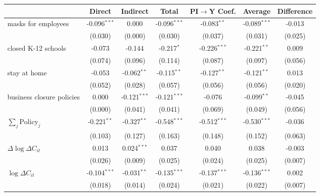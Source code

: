 
\begin{tabular}{lccccc|>{}c}
\toprule
  & Direct & Indirect & Total & PI$\to$Y Coef. & Average & Difference\\
\midrule
masks for employees & -0.096$^{***}$ & 0.000 & -0.096$^{***}$ & -0.083$^{**}$ & -0.089$^{***}$ & -0.013\\
 & (0.030) & (0.000) & (0.030) & (0.037) & (0.031) & (0.025)\\
closed K-12 schools & -0.073 & -0.144 & -0.217$^{*}$ & -0.226$^{***}$ & -0.221$^{**}$ & 0.009\\
 & (0.074) & (0.096) & (0.114) & (0.087) & (0.097) & (0.056)\\
stay at home & -0.053 & -0.062$^{**}$ & -0.115$^{**}$ & -0.127$^{**}$ & -0.121$^{**}$ & 0.013\\
 & (0.052) & (0.028) & (0.057) & (0.056) & (0.056) & (0.020)\\
business closure policies & 0.000 & -0.121$^{***}$ & -0.121$^{***}$ & -0.076 & -0.099$^{**}$ & -0.045\\
 & (0.000) & (0.041) & (0.041) & (0.069) & (0.049) & (0.056)\\
$\sum_j \mathrm{Policy}_j$ & -0.221$^{**}$ & -0.327$^{**}$ & -0.548$^{***}$ & -0.512$^{***}$ & -0.530$^{***}$ & -0.036\\
 & (0.103) & (0.127) & (0.163) & (0.148) & (0.152) & (0.063)\\
$\Delta \log \Delta C_{it}$ & 0.013 & 0.024$^{***}$ & 0.037 & 0.040 & 0.038 & -0.003\\
 & (0.026) & (0.009) & (0.025) & (0.024) & (0.025) & (0.007)\\
$\log \Delta C_{it}$ & -0.104$^{***}$ & -0.031$^{**}$ & -0.135$^{***}$ & -0.137$^{***}$ & -0.136$^{***}$ & 0.002\\
 & (0.018) & (0.014) & (0.024) & (0.021) & (0.022) & (0.007)\\
\bottomrule
\end{tabular}